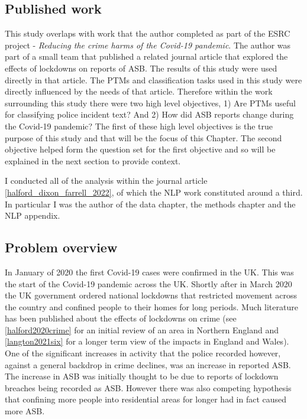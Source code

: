  
 \subsection{Published work} This study overlaps with work that the author completed as part of the ESRC project - \emph{Reducing the crime harms of the Covid-19 pandemic}. The author was part of a small team that published a related journal article \textcite{halford_dixon_farrell_2022} that explored the effects of lockdowns on reports of ASB. The results of this study were used directly in that article. The PTMs and classification tasks used in this study were directly influenced by the needs of that article. Therefore within the work surrounding this study there were two high level objectives, 1) Are PTMs useful for classifying police incident text? And 2) How did ASB reports change during the Covid-19 pandemic? The first of these high level objectives is the true purpose of this study and that will be the focus of this Chapter. The second objective helped form the question set for the first objective and so will be explained in the next section to provide context. 

I conducted all of the analysis within the journal article \ref{halford_dixon_farrell_2022}, of which the NLP work constituted around a third. In particular I was the author of the data chapter, the methods chapter and the NLP appendix.

\subsection{Problem overview} In January of 2020 the first Covid-19 cases were confirmed in the UK. This was the start of the Covid-19 pandemic across the UK. Shortly after in March 2020 the UK government ordered national lockdowns that restricted movement across the country and confined people to their homes for long periods. Much literature has been published about the effects of lockdowns on crime (see \ref{halford2020crime} for an initial review of an area in Northern England and \ref{langton2021six} for a longer term view of the impacts in England and Wales). One of the significant increases in activity that the police recorded however, against a general backdrop in crime declines, was an increase in reported ASB. The increase in ASB was initially thought to be due to reports of lockdown breaches being recorded as ASB. However there was also competing hypothesis that confining more people into residential areas for longer had in fact caused more ASB. 

